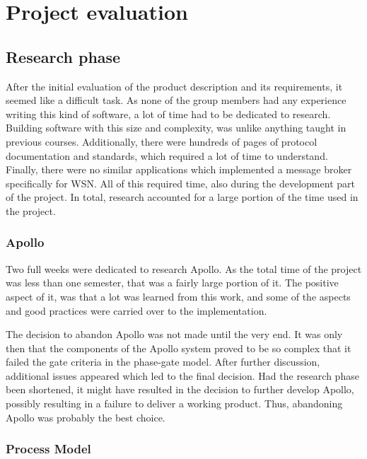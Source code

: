 
\chapter{Project evaluation}
\label{ch:project_evaluation}

\section{Research phase}
\label{sec:project_evaluation-research_phase}


After the initial evaluation of the product description and its requirements, it seemed like a difficult task. As none of the group members had any experience writing this kind of software, a lot of time had to be dedicated to research. Building software with this size and complexity, was unlike anything taught in previous courses. Additionally, there were hundreds of pages of protocol documentation and standards, which required a lot of time to understand. Finally, there were no similar applications which implemented a message broker specifically for WSN. All of this required time, also during the development part of the project. In total, research accounted for a large portion of the time used in the project.

\subsection{Apollo}
\label{subsec:project_evaluation-research_phase-apollo}

Two full weeks were dedicated to research Apollo. As the total time of the project was less than one semester, that was a fairly large portion of it. The positive aspect of it, was that a lot was learned from this work, and some of the aspects and good practices were carried over to the implementation.

The decision to abandon Apollo was not made until the very end. It was only then that the components of the Apollo system proved to be so complex that it failed the gate criteria in the phase-gate model. After further discussion, additional issues appeared which led to the final decision. Had the research phase been shortened, it might have resulted in the decision to further develop Apollo, possibly resulting in a failure to deliver a working product. Thus, abandoning Apollo was probably the best choice.

\subsection{Process Model}
\label{subsec:project_evaluation-research_phase-process_model}

